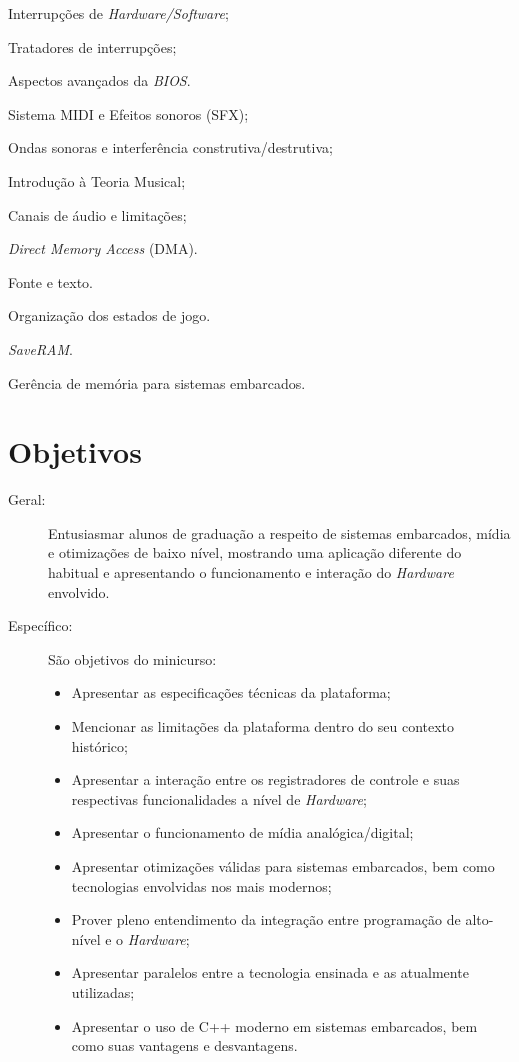 \documentclass{article}
\begin{document}
\begin{itemize*}[label={}]
    \item[] Interrupções de \textit{Hardware/Software};
    \item[] Tratadores de interrupções;
    \item[] Aspectos avançados da \textit{BIOS}.
    \item[] Sistema MIDI e Efeitos sonoros (SFX);
    \item[] Ondas sonoras e interferência construtiva/destrutiva;
    \item[] Introdução à Teoria Musical;
    \item[] Canais de áudio e limitações;
    \item[] \textit{Direct Memory Access} (DMA).
    \item[] Fonte e texto.
    \item[] Organização dos estados de jogo.
    \item[] \textit{SaveRAM}.
    \item[] Gerência de memória para sistemas embarcados.
\end{itemize*}

\section{Objetivos}

\begin{description}
    \item[Geral:] Entusiasmar alunos de graduação a respeito de sistemas embarcados, mídia e otimizações de baixo nível, mostrando uma aplicação diferente do habitual e apresentando o funcionamento e interação do \textit{Hardware} envolvido.
    \item[Específico:] São objetivos do minicurso:
        \begin{itemize}[label={-}]
                \item Apresentar as especificações técnicas da plataforma;
                \item Mencionar as limitações da plataforma dentro do seu  contexto histórico;
                \item Apresentar a interação entre os registradores de controle e suas respectivas funcionalidades a nível de \textit{Hardware};
                \item Apresentar o funcionamento de mídia analógica/digital;
                \item Apresentar otimizações válidas para sistemas embarcados, bem como tecnologias envolvidas nos mais modernos;
                \item Prover pleno entendimento da integração entre programação de alto-nível e o \textit{Hardware};
                \item Apresentar paralelos entre a tecnologia ensinada e as atualmente utilizadas;
                \item Apresentar o uso de C++ moderno em sistemas embarcados, bem como suas vantagens e desvantagens.
        \end{itemize}
\end{description}
\end{document}
